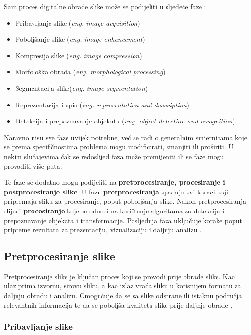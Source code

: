 \documentclass{foi}
\begin{document}
\begin{flushleft}
Sam proces digitalne obrade slike može se podijeliti u sljedeće faze \cite{ImageProcessing}:
\begin{itemize}
\item Pribavljanje slike (\textit{eng. image acquisition})
\item Poboljšanje slike (\textit{eng. image enhancement})
\item Kompresija slike (\textit{eng. image compression})
\item Morfološka obrada (\textit{eng. morphological processing})
\item Segmentacija slike(\textit{eng. image segmentation})
\item Reprezentacija i opis (\textit{eng. representation and description})
\item Detekcija i prepoznavanje objekata (\textit{eng. object detection and recognition})
\end{itemize}
\end{flushleft}

Naravno nisu sve faze uvijek potrebne, već se radi o generalnim smjernicama koje se prema specifičnostima problema mogu modificirati, smanjiti ili proširiti. U nekim slučajevima čak se redoslijed faza može promijeniti ili se faze mogu provoditi više puta.    

Te faze se dodatno mogu podijeliti na \textbf{pretprocesiranje, procesiranje i postprocesiranje slike}. U fazu \textbf{pretprocesiranja} spadaju svi koraci koji pripremaju sliku za procesiranje, poput poboljšanja slike. Nakon pretprocesiranja slijedi \textbf{procesiranje} koje se odnosi na korištenje algoritama za detekciju i prepoznavanje objekata i transformacije. Posljednja faza uključuje korake poput pripreme rezultata za prezentaciju, vizualizaciju i daljnju analizu \cite{IamgeProcesingPhases}.

\pagebreak
\subsection{Pretprocesiranje slike}

Pretprocesiranje slike je ključan proces koji se provodi prije obrade slike. Kao ulaz prima izvornu, sirovu sliku, a kao izlaz vraća sliku u korisnijem formatu za daljnju obradu i analizu. Omogućuje da se sa slike odstrane ili istaknu područja relevantnih informacija te da se poboljša kvaliteta slike prije daljnje obrade \cite{Patel2023Oct}.

\subsubsection{Pribavljanje slike}
\end{document}
